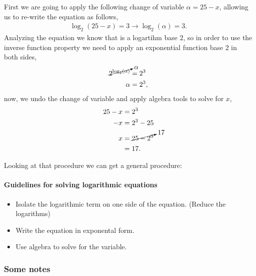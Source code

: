 \documentclass[../main.tex]{subfiles}
\begin{document}
First we are going to apply the following change of variable $\alpha=25-x$, allowing us to re-write the equation as follows,
\begin{gather*}
    \log_2(25-x)=3\rightarrow\log_2(\alpha)=3.
\end{gather*}
Analyzing the equation we know that is a logartihm base $2$, so in order to use the inverse function property we need to apply an exponential function base $2$ in both sides,
\begin{align*}
    \cancelto{\alpha}{2^{\log_2(\alpha)}} &= 2^3 \\
    \alpha &= 2^3,
\end{align*}
now, we undo the change of variable and apply algebra tools to solve for $x$,
\begin{align*}
    25-x &= 2^3 \\
    -x &= 2^3 - 25 \\
    x &= \cancelto{17}{25 - 2^3} \\
      &= 17.
\end{align*}

Looking at that procedure we can get a general procedure:
\paragraph{Guidelines for solving logarithmic equations}
\begin{itemize}
    \item Isolate the logarithmic term on one side of the equation. (Reduce the logarithms)
    \item Write the equation in exponental form.
    \item Use algebra to solve for the variable.
\end{itemize}

\subsubsection{Some notes}
\end{document}
